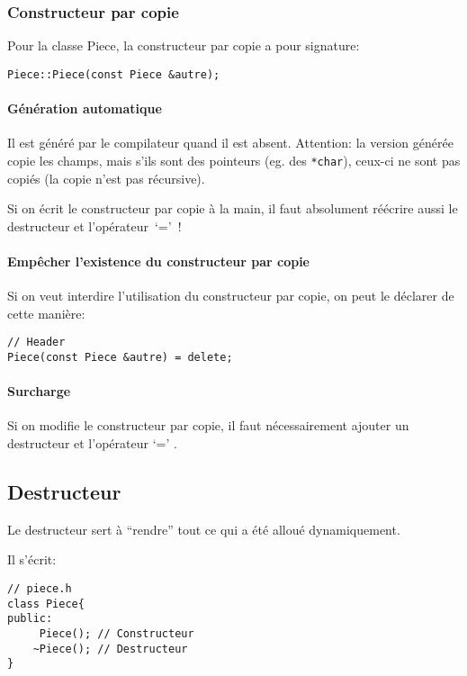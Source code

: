 \documentclass[10pt,a4paper,french]{article}
\begin{document}
\subsubsection{Constructeur par copie\label{constructeur-copie}}

Pour la classe Piece, la constructeur par copie a pour signature:

\begin{verbatim}
Piece::Piece(const Piece &autre);
\end{verbatim}

\paragraph{Génération automatique}

Il est généré par le compilateur quand il est absent. Attention: la version générée copie les champs, mais s'ils sont des pointeurs (eg. des \texttt{*char}), ceux-ci ne sont pas copiés (la copie n'est pas récursive).

Si on écrit le constructeur par copie à la main, il faut absolument réécrire aussi le destructeur et l'opérateur~`='~!

\paragraph{Empêcher l'existence du constructeur par copie}

Si on veut interdire l'utilisation du constructeur par copie, on peut le déclarer de cette manière:

\begin{verbatim}
// Header
Piece(const Piece &autre) = delete;
\end{verbatim}

\paragraph{Surcharge}
Si on modifie le constructeur par copie, il faut nécessairement ajouter un destructeur  et l'opérateur `=' .

\subsection{Destructeur\label{destructeur}}

Le destructeur sert à ``rendre'' tout ce qui a été alloué dynamiquement.

Il s'écrit:
\begin{verbatim}
// piece.h
class Piece{
public:
     Piece(); // Constructeur
    ~Piece(); // Destructeur
}
\end{verbatim}
\end{document}
